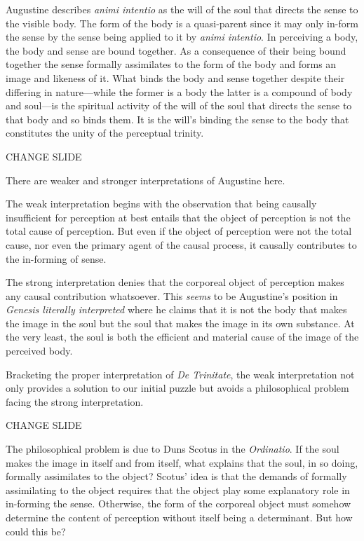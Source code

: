 \documentclass[12pt]{article}
\begin{document}
Augustine describes \emph{animi intentio} as the will of the soul that directs the sense to the visible body. The form of the body is a quasi-parent since it may only in-form the sense by the sense being applied to it by \emph{animi intentio}. In perceiving a body, the body and sense are bound together. As a consequence of their being bound together the sense formally assimilates to the form of the body and forms an image and likeness of it. What binds the body and sense together despite their differing in nature---while the former is a body the latter is a compound of body and soul---is the spiritual activity of the will of the soul that directs the sense to that body and so binds them. It is the will's binding the sense to the body that constitutes the unity of the perceptual trinity.

CHANGE SLIDE

There are weaker and stronger interpretations of Augustine here. 

The weak interpretation begins with the observation that being causally insufficient for perception at best entails that the object of perception is not the total cause of perception. But even if the object of perception were not the total cause, nor even the primary agent of the causal process, it causally contributes to the in-forming of sense.

The strong interpretation denies that the corporeal object of perception makes any causal contribution whatsoever. This \emph{seems} to be Augustine's position in \emph{Genesis literally interpreted} where he claims that it is not the body that makes the image in the soul but the soul that makes the image in its own substance. At the very least, the soul is both the efficient and material cause of the image of the perceived body.

Bracketing the proper interpretation of \emph{De Trinitate}, the weak interpretation not only provides a solution to our initial puzzle but avoids a philosophical problem facing the strong interpretation.

CHANGE SLIDE

The philosophical problem is due to Duns Scotus in the \emph{Ordinatio}. If the soul makes the image in itself and from itself, what explains that the soul, in so doing, formally assimilates to the object? Scotus' idea is that the demands of formally assimilating to the object requires that the object play some explanatory role in in-forming the sense. Otherwise, the form of the corporeal object must somehow determine the content of perception without itself being a determinant. But how could this be?
\end{document}
